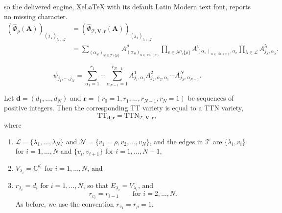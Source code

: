 \documentclass[10pt,a4paper]{amsart}
\newcommand{\CC}{\mathbb{C}}
\begin{document}
so the delivered engine, XeLaTeX with its default Latin Modern text font, reports no missing character.
\begin{align} \label{eq:TTN_param}
\left(\widehat{\Phi}_\rho(\mathbf{A})\right)_{(j_\lambda)_{\lambda\in\mathscr L}} &= \left(
    \widehat{\Phi}_{\mathscr T,\mathbf V,\mathbf r}
    (\mathbf A)
    \right)_{(j_\lambda)_{\lambda\in\mathscr L}} \nonumber\\
    &=
    \sum_{(\alpha_w)_{w\in\mathscr T\setminus\{\rho\}}}
    A^\rho_{(\alpha_u)_{u\in\operatorname{ch}(\rho)}}
    \prod_{v\in\mathscr N\setminus\{\rho\}}
    A^v_{(\alpha_u)_{u\in\operatorname{ch}(v)},\alpha_v}
    \prod_{\lambda\in\mathscr L}
    A^\lambda_{j_\lambda,\alpha_\lambda}.
\end{align}

\begin{equation}\label{eq:TT-entries}
\psi_{j_1,\cdots ,j_N}
=
\sum_{\alpha_1=1}^{r_1}
\cdots
\sum_{\alpha_{N-1}=1}^{r_{N-1}}
A^1_{j_1,\alpha_1}
A^2_{j_2,\alpha_2,\alpha_1}
\cdots
A^N_{j_N,\alpha_{N-1}}.
\end{equation}

\begin{proposition}\label{prop:TT_is_TTN}
Let $\mathbf{d}=(d_1, \ldots, d_N)$ and $\mathbf{r} = (r_0=1, r_1, \ldots, r_{N-1},r_N=1)$ be sequences of positive integers. Then the corresponding TT variety is equal to a TTN variety,
$$ \mathrm{TT}_{\mathbf{d}, \mathbf{r}} = \mathrm{TTN}_{\mathscr{T}, \mathbf{V},\mathbf{r}},$$
where 
\begin{enumerate}
\item $\mathscr{L} = \{\lambda_1,\ldots, \lambda_N\}$ and $\mathscr{N} = \{v_1=\rho, v_2, \ldots, v_N\}$, and the edges in $\mathscr{T}$ are  $\{\lambda_i, v_i\}$ 
for $i=1, \ldots, N$ and $\{v_i, v_{i+1}\}$ for $i=1,\ldots, N-1$,
\item $V_{\lambda_i} = \CC^{d_i}$ for $i=1,\ldots, N$, and
\item $r_{\lambda_i}=d_i$ for $i=1,\ldots,N$, so that
$E_{\lambda_i}=V_{\lambda_i}$, and
\[
r_{v_i}=r_{i-1}
\qquad
\text{for }i=2,\ldots,N.
\]
As before, we use the convention $r_{v_1}=r_\rho=1$.

\end{enumerate}
\end{proposition}
\end{document}
